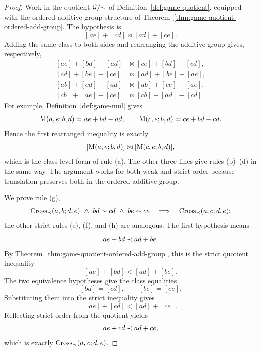 \begin{proof}
  \leanok
  Work in the quotient \(\mathcal G/{\sim}\) of
  Definition~\ref{def:game-quotient}, equipped with the ordered additive group structure of
  Theorem~\ref{thm:game-quotient-ordered-add-group}.  The hypothesis is
  \[
    [ae]+[cd]\mathrel{\bowtie}[ad]+[ce].
  \]
  Adding the same class to both sides and rearranging the additive group gives,
  respectively,
  \[
    \begin{aligned}
      {}[ae]+[bd]-[ad]&\mathrel{\bowtie}[ce]+[bd]-[cd],\\
      {}[cd]+[be]-[ce]&\mathrel{\bowtie}[ad]+[be]-[ae],\\
      {}[ab]+[cd]-[ad]&\mathrel{\bowtie}[ab]+[ce]-[ae],\\
      {}[cb]+[ae]-[ce]&\mathrel{\bowtie}[cb]+[ad]-[cd].
    \end{aligned}
  \]
  For example, Definition~\ref{def:game-mul} gives
  \[
    \operatorname{M}(a,e;b,d)=ae+bd-ad,
    \qquad
    \operatorname{M}(c,e;b,d)=ce+bd-cd.
  \]
  Hence the first rearranged inequality is exactly
  \[
    [\operatorname{M}(a,e;b,d)]\mathrel{\bowtie}[\operatorname{M}(c,e;b,d)],
  \]
  which is the class-level form of rule \textup{(a)}.
  The other three lines give rules \textup{(b)}--\textup{(d)} in the same way.
  The argument works for both weak and strict order because translation preserves both in
  the ordered additive group.

  We prove rule \textup{(g)},
  \[
    \operatorname{Cross}_{\prec}(a,b;d,e)
      \ \wedge\ bd\sim cd
      \ \wedge\ be\sim ce
      \quad\Longrightarrow\quad
    \operatorname{Cross}_{\prec}(a,c;d,e);
  \]
  the other strict rules \textup{(e)}, \textup{(f)}, and \textup{(h)} are analogous.
  The first hypothesis means
  \[
    ae+bd\prec ad+be.
  \]
  By Theorem~\ref{thm:game-quotient-ordered-add-group}, this is the strict
  quotient inequality
  \[
    [ae]+[bd]<[ad]+[be].
  \]
  The two equivalence hypotheses give the class equalities
  \[
    [bd]=[cd],
    \qquad
    [be]=[ce].
  \]
  Substituting them into the strict inequality gives
  \[
    [ae]+[cd]<[ad]+[ce].
  \]
  Reflecting strict order from the quotient yields
  \[
    ae+cd\prec ad+ce,
  \]
  which is exactly
  \(\operatorname{Cross}_{\prec}(a,c;d,e)\).
\end{proof}

